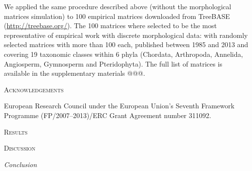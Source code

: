 \documentclass[12pt,letterpaper]{article}
\renewcommand{\section}[1]{%
\bigskip
\begin{center}
\begin{Large}
\normalfont\scshape #1
\medskip
\end{Large}
\end{center}}
\renewcommand{\subsection}[1]{%
\bigskip
\begin{center}
\begin{large}
\normalfont\itshape #1
\end{large}
\end{center}}
\begin{document}
We applied the same procedure described above (without the morphological matrices simulation) to 100 empirical matrices downloaded from TreeBASE (\url{http://treebase.org/}).
The 100 matrices where selected to be the most representative of empirical work with discrete morphological data: with randomly selected matrices with more than 100 each, published between 1985 and 2013 and covering 19 taxonomic classes within 6 phyla (Chordata, Arthropoda, Annelida, Angiosperm, Gymnosperm and Pteridophyta).
The full list of matrices is available in the supplementary materials @@@.

\section{Acknowledgements}
European Research Council under the European Union’s Seventh Framework Programme (FP/2007–2013)/ERC Grant Agreement number 311092.


\section{Results}


\section{Discussion}


\subsection{Conclusion}




\end{document}

